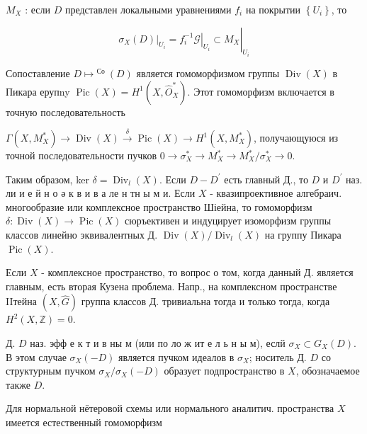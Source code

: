\documentclass[10pt]{article}
\begin{document}
$M_{X}$ : если $D$ представлен локальными уравнениями $f_{i}$ на покрытии $\left\{U_{i}\right\}$, то



\[

\left.\sigma_{X}(D)\right|_{U_{i}}=\left.\left.f_{i}^{-1} \mathcal{G}\right|_{U_{i}} \subset M_{X}\right|_{U_{i}}

\]



Сопоставление $D \mapsto{ }^{\text {Со }}(D)$ является гомоморфизмом группы $\operatorname{Div}(X)$ в Пикара ерупny $\operatorname{Pic}(X)=H^{1}\left(X, \widehat{O}_{X}^{*}\right)$. Этот гомоморфизм включается в точную последовательность



$\Gamma\left(X, M_{X}^{*}\right) \rightarrow \operatorname{Div}(X) \stackrel{\delta}{\longrightarrow} \operatorname{Pic}(X) \rightarrow H^{1}\left(X, M_{X}^{*}\right)$, получающуюся из точной последовательности пучков $0 \longrightarrow \sigma_{X}^{*} \rightarrow M_{X}^{*} \longrightarrow M_{X}^{*} / \sigma_{X}^{*} \longrightarrow 0$.



Таким образом, ker $\delta=\operatorname{Div}_{l}(X)$. Если $D-D^{\prime}$ есть главный Д., то $D$ и $D^{\prime}$ наз. ли и е й н о ә к в и в а ле н тн ы м и. Если $X$ - квазипроективное алгебраич. многообразие или комплексное пространство Шіейна, то гомоморфизм $\delta: \operatorname{Div}(X) \rightarrow \operatorname{Pic}(X)$ сюръективен и индуцирует изоморфизм группы классов линейно эквивалентных Д. $\operatorname{Div}(X) / \operatorname{Div}_{l}(X)$ на группу Пикара $\operatorname{Pic}(X)$.



Если $X$ - комплексное пространство, то вопрос о том, когда данный Д. является главным, есть вторая Кузена проблема. Напр., на комплексном пространстве IIтейна $(X, \widehat{G})$ группа классов Д. тривиальна тогда и только тогда, когда $H^{2}(X, \mathbb{Z})=0$.



Д. $D$ наз. эфф е к т и в ны м (или по ло ж ит е л ь н ы м), еслй $\sigma_{X} \subset G_{X}(D)$. В этом случае $\sigma_{X}(-D)$ является пучком идеалов в $\sigma_{X}$; носитель Д. $D$ со структурным пучком $\sigma_{X} / \sigma_{X}(-D)$ образует подпространство в $X$, обозначаемое также $D$.



Для нормальной нётеровой схемы или нормального аналитич. пространства $X$ имеется естественный гомоморфизм
\end{document}
